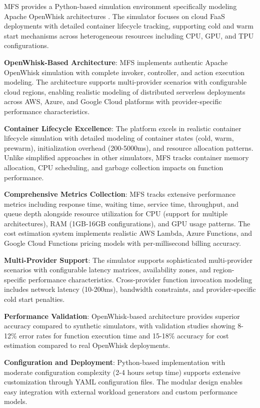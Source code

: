 MFS provides a Python-based simulation environment specifically modeling Apache OpenWhisk architectures \cite{bermbach2019mfs}. The simulator focuses on cloud FaaS deployments with detailed container lifecycle tracking, supporting cold and warm start mechanisms across heterogeneous resources including CPU, GPU, and TPU configurations.

\textbf{OpenWhisk-Based Architecture}: MFS implements authentic Apache OpenWhisk simulation with complete invoker, controller, and action execution modeling. The architecture supports multi-provider scenarios with configurable cloud regions, enabling realistic modeling of distributed serverless deployments across AWS, Azure, and Google Cloud platforms with provider-specific performance characteristics.

\textbf{Container Lifecycle Excellence}: The platform excels in realistic container lifecycle simulation with detailed modeling of container states (cold, warm, prewarm), initialization overhead (200-5000ms), and resource allocation patterns. Unlike simplified approaches in other simulators, MFS tracks container memory allocation, CPU scheduling, and garbage collection impacts on function performance.

\textbf{Comprehensive Metrics Collection}: MFS tracks extensive performance metrics including response time, waiting time, service time, throughput, and queue depth alongside resource utilization for CPU (support for multiple architectures), RAM (1GB-16GB configurations), and GPU usage patterns. The cost estimation system implements realistic AWS Lambda, Azure Functions, and Google Cloud Functions pricing models with per-millisecond billing accuracy.

\textbf{Multi-Provider Support}: The simulator supports sophisticated multi-provider scenarios with configurable latency matrices, availability zones, and region-specific performance characteristics. Cross-provider function invocation modeling includes network latency (10-200ms), bandwidth constraints, and provider-specific cold start penalties.

\textbf{Performance Validation}: OpenWhisk-based architecture provides superior accuracy compared to synthetic simulators, with validation studies showing 8-12\% error rates for function execution time and 15-18\% accuracy for cost estimation compared to real OpenWhisk deployments.

\textbf{Configuration and Deployment}: Python-based implementation with moderate configuration complexity (2-4 hours setup time) supports extensive customization through YAML configuration files. The modular design enables easy integration with external workload generators and custom performance models.

